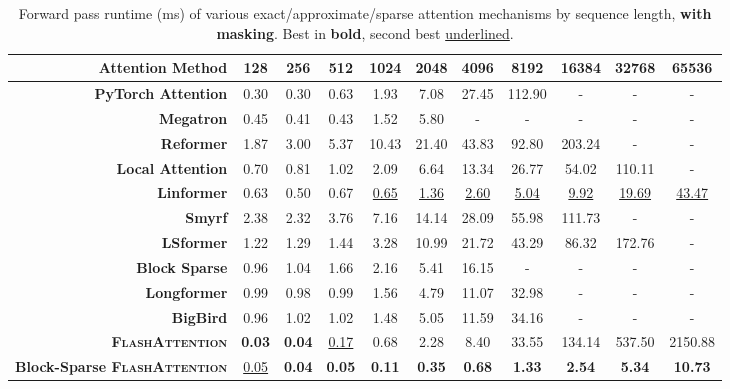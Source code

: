 \documentclass{article}
\newcommand{\sysname}{\textsc{FlashAttention}\xspace}
\begin{document}
\begin{table}
\centering
\scriptsize
\captionsetup{font=small}
\caption{Forward pass runtime (ms) of various exact/approximate/sparse attention mechanisms by sequence length, \textbf{with masking}. Best in \textbf{bold}, second best \underline{underlined}.}
\begin{tabular}{@{}r|cccccccccc@{}}
\toprule
\textbf{Attention Method} & 128 & 256 & 512 & 1024 & 2048 & 4096 & 8192 & 16384 & 32768 & 65536 \\
\hline
\textbf{PyTorch Attention} & 0.30 & 0.30 & 0.63 & 1.93 & 7.08 & 27.45 & 112.90 & - & - & - \\
\textbf{Megatron} & 0.45 & 0.41 & 0.43 & 1.52 & 5.80 & - & - & - & - & - \\
\hline
\textbf{Reformer} & 1.87 & 3.00 & 5.37 & 10.43 & 21.40 & 43.83 & 92.80 & 203.24 & - & - \\
\textbf{Local Attention} & 0.70 & 0.81 & 1.02 & 2.09 & 6.64 & 13.34 & 26.77 & 54.02 & 110.11 & - \\
\textbf{Linformer} & 0.63 & 0.50 & 0.67 & \underline{0.65} & \underline{1.36} & \underline{2.60} & \underline{5.04} & \underline{9.92} & \underline{19.69} & \underline{43.47} \\
\textbf{Smyrf} & 2.38 & 2.32 & 3.76 & 7.16 & 14.14 & 28.09 & 55.98 & 111.73 & - & - \\
\textbf{LSformer} & 1.22 & 1.29 & 1.44 & 3.28 & 10.99 & 21.72 & 43.29 & 86.32 & 172.76 & - \\
\hline
\textbf{Block Sparse} & 0.96 & 1.04 & 1.66 & 2.16 & 5.41 & 16.15 & - & - & - & - \\
\textbf{Longformer} & 0.99 & 0.98 & 0.99 & 1.56 & 4.79 & 11.07 & 32.98 & - & - & - \\
\textbf{BigBird} & 0.96 & 1.02 & 1.02 & 1.48 & 5.05 & 11.59 & 34.16 & - & - & - \\
\hline
\textbf{\sysname} & \textbf{0.03} & \textbf{0.04} & \underline{0.17} & 0.68 & 2.28 & 8.40 & 33.55 & 134.14 & 537.50 & 2150.88 \\
\textbf{Block-Sparse \sysname} & \underline{0.05} & \textbf{0.04} & \textbf{0.05} & \textbf{0.11} & \textbf{0.35} & \textbf{0.68} & \textbf{1.33} & \textbf{2.54} & \textbf{5.34} & \textbf{10.73} \\
\bottomrule
\end{tabular}
\label{tab:masking_forward_pass}
\end{table}
\end{document}
